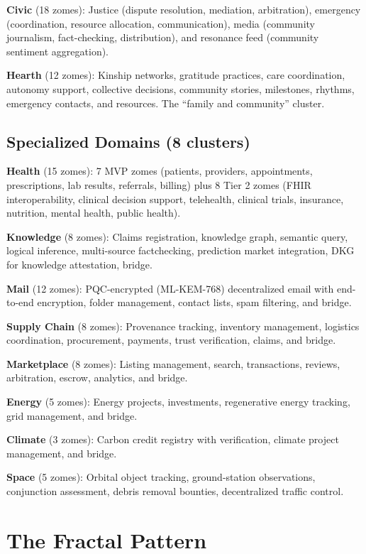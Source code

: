 \documentclass[11pt,twocolumn]{article}
\begin{document}
\textbf{Civic} (18 zomes): Justice (dispute resolution, mediation,
arbitration), emergency (coordination, resource allocation, communication),
media (community journalism, fact-checking, distribution), and resonance
feed (community sentiment aggregation).

\textbf{Hearth} (12 zomes): Kinship networks, gratitude practices, care
coordination, autonomy support, collective decisions, community stories,
milestones, rhythms, emergency contacts, and resources. The ``family and
community'' cluster.

\subsection{Specialized Domains (8 clusters)}

\textbf{Health} (15 zomes): 7 MVP zomes (patients, providers, appointments,
prescriptions, lab results, referrals, billing) plus 8 Tier 2 zomes (FHIR
interoperability, clinical decision support, telehealth, clinical trials,
insurance, nutrition, mental health, public health).

\textbf{Knowledge} (8 zomes): Claims registration, knowledge graph, semantic
query, logical inference, multi-source factchecking, prediction market
integration, DKG for knowledge attestation, bridge.

\textbf{Mail} (12 zomes): PQC-encrypted (ML-KEM-768) decentralized email
with end-to-end encryption, folder management, contact lists, spam filtering,
and bridge.

\textbf{Supply Chain} (8 zomes): Provenance tracking, inventory management,
logistics coordination, procurement, payments, trust verification, claims,
and bridge.

\textbf{Marketplace} (8 zomes): Listing management, search, transactions,
reviews, arbitration, escrow, analytics, and bridge.

\textbf{Energy} (5 zomes): Energy projects, investments, regenerative
energy tracking, grid management, and bridge.

\textbf{Climate} (3 zomes): Carbon credit registry with verification,
climate project management, and bridge.

\textbf{Space} (5 zomes): Orbital object tracking, ground-station observations,
conjunction assessment, debris removal bounties, decentralized traffic control.

\section{The Fractal Pattern}
\end{document}
